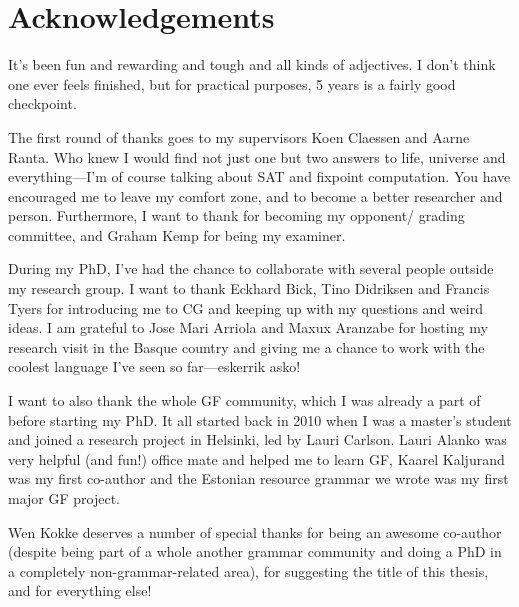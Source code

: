 \chapter*{Acknowledgements}\label{chp:acknowledgements}

It's been fun and rewarding and tough and all kinds of adjectives.  I
don't think one ever feels finished, but for practical purposes, 5
years is a fairly good checkpoint.

The first round of thanks goes to my supervisors Koen Claessen and
Aarne Ranta. Who knew I would find not just one but two answers to
life, universe and everything---I'm of course talking about SAT and
fixpoint computation. You have encouraged me to leave my
comfort zone, and to become a better researcher and person.
Furthermore, I want to thank  for becoming my opponent/ grading
committee, %
and Graham Kemp for being my examiner.


During my PhD, I've had the chance to collaborate with several people
outside my research group. I want to thank Eckhard Bick, Tino
Didriksen and Francis Tyers for introducing me to CG and keeping up
with my questions and weird ideas.  I am grateful to Jose Mari Arriola
and Maxux Aranzabe for hosting my research visit in the Basque country
and giving me a chance to work with the coolest language I've seen so
far---eskerrik asko!

I want to also thank the whole GF community, which I was already a
part of before starting my PhD. It all started back in 2010 when I was
a master's student and joined a research project in Helsinki, led by
Lauri Carlson. Lauri Alanko was very helpful (and fun!)  office mate
and helped me to learn GF, Kaarel Kaljurand was my first co-author and
the Estonian resource grammar we wrote was my first major GF project.

Wen Kokke deserves a number of special thanks for being an awesome
co-author (despite being part of a whole another grammar community and
doing a PhD in a completely non-grammar-related area), for suggesting
the title of this thesis, and for everything else!

